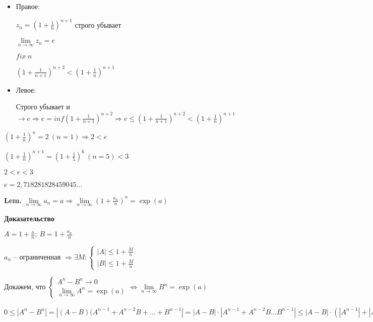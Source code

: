 \documentclass[14pt, letter paper]{article}
\begin{document}
\begin{enumerate}
    \begin{itemize}
        \item Правое:

        $z_n = (1 + \frac{1}{n})^{n+1}$ строго убывает

        $\lim\limits_{n \rightarrow \infty}{z_n} = e$

        $fix\ n$

        $(1 + \frac{1}{n+1})^{n+2} < (1 + \frac{1}{n})^{n+1}$

        \item Левое:

        Строго убывает и $\rightarrow e \Rightarrow e = inf(1 + \frac{1}{n+1})^{n+2} \Rightarrow e \leq (1 + \frac{1}{n+1})^{n+2} < (1 + \frac{1}{n})^{n+1}$
    \end{itemize}

    $(1 + \frac{1}{n})^n = 2\ (n = 1) \Rightarrow 2 < e$

    $(1 + \frac{1}{n})^{n+1} = (1 + \frac{1}{5})^6\ (n = 5) < 3$

    $2 < e < 3$

    $e = 2,718281828459045 \ldots$
\end{enumerate}

\textbf{Lem.} $\lim\limits_{n \rightarrow \infty}{a_n} = a \Rightarrow \lim\limits_{n \rightarrow \infty}{(1 + \frac{a_n}{n})^n} = \exp(a)$

\begin{center}
    \textbf{Доказательство}
\end{center}

$A = 1 + \frac{a}{n};\ B = 1 + \frac{a_n}{n}$

$a_n$ -- ограниченная $\Rightarrow \exists M : \begin{cases}
    |A| \leq 1 + \frac{M}{n} \\
    |B| \leq 1 + \frac{M}{n}
\end{cases}$

Докажем, что $\begin{cases}
    A^n - B^n \rightarrow 0 \\
    \lim\limits_{n \rightarrow \infty}{A^n} = \exp(a)
\end{cases} \Leftrightarrow \lim\limits_{n \rightarrow \infty}{B^n} = \exp(a)$

$0 \leq |A^n - B^n| = |(A-B)(A^{n-1} + A^{n-2}B + \ldots + B^{n-1}| = |A-B| \cdot |A^{n-1} + A^{n-2}B \ldots B^{n-1}| \leq |A-B| \cdot (|A^{n-1}| + |A^{n-2}B| + \ldots + |B^{n-1}|) \leq |A - B| \cdot n(1 + \frac{M}{n})^{n-1} = |1 + \frac{a}{n} - 1 - \frac{a_n}{n}| \cdot n \cdot (1 + \frac{M}{n})^{n-1} = \frac{|a - a_n|}{n} \cdot n \cdot (1 + \frac{M}{n})^{n-1} = |a - a_n| \cdot (1 + \frac{M}{n})^{n-1}$
\end{document}
